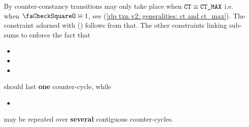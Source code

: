\saNote{}
By counter-constancy transitions may only take place when $\texttt{CT} \equiv \texttt{CT\_MAX}$ i.e. when $\done \equiv 1$, see (\ref{rlp txn v2: generalities: ct and ct_max}).
The constraint adorned with (\sanityCheck) follows from that.
The other constraints linking sub-sums to \done{} enforce the fact that
\begin{itemize}
    \item \rlpTxnComputationColumnIsPrefixOfAccessListItem {}
    \item \rlpTxnComputationColumnIsAccessListAddress      {}
    \item \rlpTxnComputationColumnIsPrefixOfStorageKeyList {}
\end{itemize}
should last \textbf{one} counter-cycle, while
\begin{itemize}
    \item \rlpTxnComputationColumnIsAccessListStorageKey {}
\end{itemize}
may be repeated over \textbf{several} contiguous counter-cycles.
